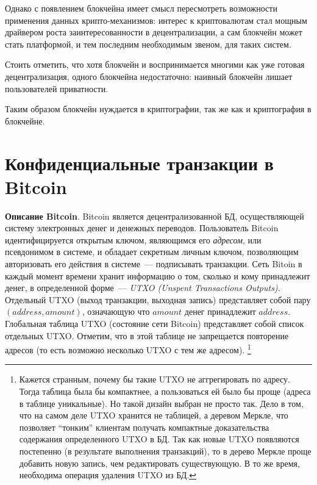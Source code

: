\documentclass{article}
\begin{document}
 Однако с появлением блокчейна имеет смысл пересмотреть
 возможности применения данных крипто-механизмов:
 интерес к криптовалютам стал мощным драйвером роста заинтересованности в децентрализации,
  а сам блокчейн может стать платформой,
  и тем последним необходимым звеном,  для таких систем.

  Стоить отметить, что хотя блокчейн и воспринимается многими как уже готовая децентрализация,
   одного блокчейна недостаточно: наивный блокчейн лишает пользователей приватности.

Таким образом блокчейн нуждается в криптографии, так же как и криптография в блокчейне.

\section{Конфиденциальные транзакции в Bitcoin}

{\bf Описание Bitcoin}.
Bitcoin является децентрализованной БД, осуществляющей систему электронных денег и денежных переводов.
Пользователь Bitcoin идентифицируется открытым ключом, являющимся его \textit{адресом}, или псевдонимом в системе,
и обладает секретным личным ключом, позволяющим авторизовать его действия в системе~--- подписывать транзакции.
Сеть Bitoin в каждый момент времени хранит информацию о том, сколько и кому принадлежит денег,
в определенной форме~--- \textit{UTXO (Unspent Transactions Outputs)}.
Отдельный UTXO (выход транзакции, выходная запись) представляет собой пару $(address, amount)$,
означающую что $amount$ денег принадлежит $address$.
Глобальная таблица UTXO (состояние сети Bitcoin) представляет собой список отдельных UTXO.
Отметим, что в этой таблице не запрещается повторение адресов (то есть возможно несколько UTXO с тем же адресом).
\footnote{Кажется странным, почему бы такие UTXO не аггрегировать по адресу.
Тогда таблица была бы компактнее,
а пользоваться ей было бы проще (адреса в таблице уникальные). Но такой дизайн выбран не просто так.
Дело в том, что на самом деле UTXO хранится не таблицей, а деревом Меркле,
что позволяет ``тонким'' клиентам
получать компактные доказательства содержания определенного UTXO в БД.
Так как новые UTXO появляются постепенно (в результате выполнения транзакций),
то в дерево Меркле проще добавить новую запись, чем редактировать существующую.
В то же время, необходима операция удаления UTXO из БД.}
\end{document}
